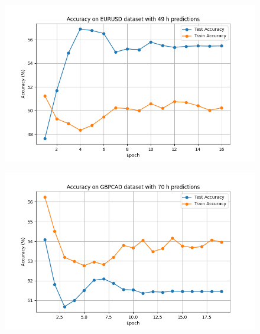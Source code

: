 \begin{figure}[h!]

  \centering
  \includegraphics[width=\linewidth]{"pictures/eurusd_49h_results.png"}
	\caption{}
	\label{fig:eurusud_fig}
\end{figure}

\begin{figure}[h!]

  \centering
  \includegraphics[width=\linewidth]{"pictures/gbpcad_70h_results.png"} 
	\caption{}
	\label{fig:gbpcad_fig}
\end{figure}

